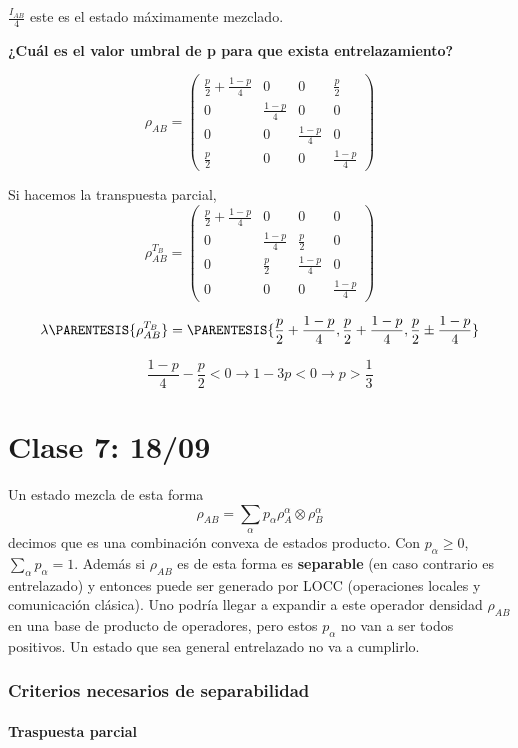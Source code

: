 $\frac{I_{AB}}{4}$ este es el estado máximamente mezclado.

\textbf{¿Cuál es el valor umbral de p para que exista entrelazamiento?}

\[
\rho_{AB}=\left(\begin{array}{cccc}
\frac{p}{2}+\frac{1-p}{4} & 0 & 0 & \frac{p}{2}\\
0 & \frac{1-p}{4} & 0 & 0\\
0 & 0 & \frac{1-p}{4} & 0\\
\frac{p}{2} & 0 & 0 & \frac{1-p}{4}
\end{array}\right)
\]

Si hacemos la transpuesta parcial, 
\[
\rho_{AB}^{T_{B}}=\left(\begin{array}{cccc}
\frac{p}{2}+\frac{1-p}{4} & 0 & 0 & 0\\
0 & \frac{1-p}{4} & \frac{p}{2} & 0\\
0 & \frac{p}{2} & \frac{1-p}{4} & 0\\
0 & 0 & 0 & \frac{1-p}{4}
\end{array}\right)
\]

\[
\lambda\PARENTESIS{\rho_{AB}^{T_{B}}}=\PARENTESIS{\frac{p}{2}+\frac{1-p}{4},\frac{p}{2}+\frac{1-p}{4},\frac{p}{2}\pm\frac{1-p}{4}}
\]

\[
\frac{1-p}{4}-\frac{p}{2}<0\rightarrow1-3p<0\rightarrow p>\frac{1}{3}
\]


\chapter{Clase 7: 18/09}

Un estado mezcla de esta forma
\[
\rho_{AB}=\sum_{\alpha}p_{\alpha}\rho_{A}^{\alpha}\otimes\rho_{B}^{\alpha}
\]
decimos que es una combinación convexa de estados producto. Con $p_{\alpha}\geq0$,
$\sum_{\alpha}p_{\alpha}=1$. Además si $\rho_{AB}$ es de esta forma
es \textbf{separable} (en caso contrario es entrelazado) y entonces
puede ser generado por LOCC (operaciones locales y comunicación clásica).
Uno podría llegar a expandir a este operador densidad $\rho_{AB}$
en una base de producto de operadores, pero estos $p_{\alpha}$ no
van a ser todos positivos. Un estado que sea general entrelazado no
va a cumplirlo.

\subsection{Criterios necesarios de separabilidad}

\subsubsection{Traspuesta parcial}

